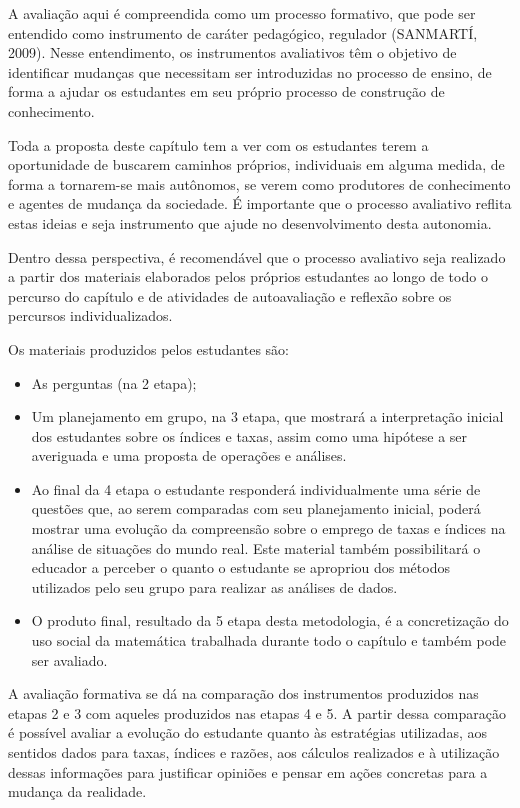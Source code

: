 \begin{apresentacao}
A avaliação aqui é compreendida como um processo formativo, que pode ser entendido como instrumento de caráter pedagógico, regulador (SANMARTÍ, 2009). Nesse entendimento, os instrumentos avaliativos têm o objetivo de identificar mudanças que necessitam ser introduzidas no processo de ensino, de forma a ajudar os estudantes em seu próprio processo de construção de conhecimento. 

Toda a proposta deste capítulo tem a ver com os estudantes terem a oportunidade de buscarem caminhos próprios, individuais em alguma medida, de forma a tornarem-se mais autônomos, se verem como produtores de conhecimento e agentes de mudança da sociedade. É importante que o processo avaliativo reflita estas ideias e seja instrumento que ajude no desenvolvimento desta autonomia. 

Dentro dessa perspectiva, é recomendável que o processo avaliativo seja realizado a partir dos materiais elaborados pelos próprios estudantes ao longo de todo o percurso do capítulo e de atividades de autoavaliação e reflexão sobre os percursos individualizados. 

Os materiais produzidos pelos estudantes são: 
\begin{itemize}
\item As perguntas (na 2 etapa);
\item Um planejamento em grupo, na 3 etapa, que mostrará a interpretação inicial dos estudantes sobre os índices e taxas, assim como uma hipótese a ser averiguada e uma proposta de operações e análises.
\item Ao final da 4 etapa o estudante responderá individualmente uma série de questões que, ao serem comparadas com seu planejamento inicial, poderá mostrar uma evolução da compreensão sobre o emprego de taxas e índices na análise de situações do mundo real. Este material também possibilitará o educador a perceber o quanto o estudante se apropriou dos métodos utilizados pelo seu grupo para realizar as análises de dados. 
\item O produto final, resultado da 5 etapa desta metodologia, é a concretização do uso social da matemática trabalhada durante todo o capítulo e também pode ser avaliado.
\end{itemize}

A avaliação formativa se dá na comparação dos instrumentos produzidos nas etapas 2 e 3 com aqueles produzidos nas etapas 4 e 5. A partir dessa comparação é possível avaliar a evolução do estudante quanto às estratégias utilizadas, aos sentidos dados para taxas, índices e razões, aos cálculos realizados e à utilização dessas informações para justificar opiniões e pensar em ações concretas para a mudança da realidade. 


\end{apresentacao}
